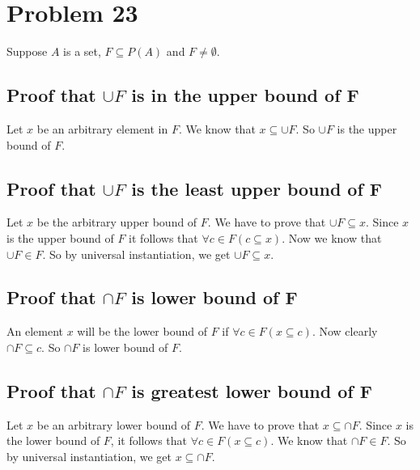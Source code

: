 \documentclass{article}
\begin{document}
\section{Problem 23}
Suppose $A$ is a set, $F \subseteq P(A)$ and $F \neq \emptyset$.
\subsection{Proof that $\cup F$ is in the upper bound of F}
Let $x$ be an arbitrary element in $F$. We know that $x \subseteq
\cup F$. So $\cup F$ is the upper bound of $F$.
\subsection{Proof that $\cup F$ is the least upper bound of F}
Let $x$ be the arbitrary upper bound of $F$. We have to prove that
$\cup F \subseteq x$. Since $x$ is the upper bound of $F$ it follows
that $\forall c \in F (c \subseteq x)$. Now we know that $\cup F \in
F$. So by universal instantiation, we get $\cup F \subseteq x$.
\subsection{Proof that $\cap F$ is lower bound of F}
An element $x$ will be the lower bound of $F$ if $\forall c \in
F(x \subseteq c)$. Now clearly $\cap F \subseteq c$. So $\cap F$ is
lower bound of $F$.
\subsection{Proof that $\cap F$ is greatest lower bound of F}
Let $x$ be an arbitrary lower bound of $F$. We have to prove that $x
\subseteq \cap F$. Since $x$ is the lower bound of $F$, it follows
that $\forall c \in F(x \subseteq c)$. We know that $\cap F \in F$. So
by universal instantiation, we get $x \subseteq \cap F$.
\end{document}
